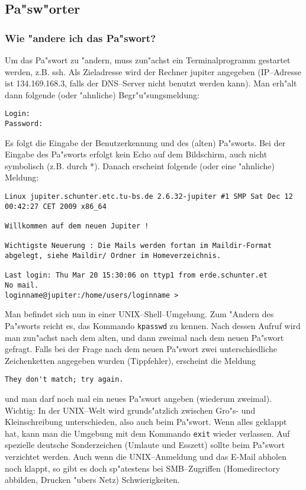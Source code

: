 
\subsection{Pa"sw"orter}
\label{passwort}

\subsubsection*{Wie "andere ich das Pa"swort?}

Um das Pa"swort zu "andern, muss zun"achst ein Terminalprogramm gestartet werden,
z.B. \glossar ssh. Als Zieladresse wird der Rechner jupiter angegeben
(IP--Adresse ist 134.169.168.3, falls der \glossar DNS--Server nicht benutzt
werden kann). Man erh"alt dann folgende (oder "ahnliche) Begr"u"sungsmeldung: 

\begin{verbatim}
Login:
Password: 
\end{verbatim}
Es folgt die Eingabe der Benutzerkennung und des (alten) Pa"sworts. Bei der
Eingabe des Pa"sworts erfolgt kein Echo auf dem Bildschirm, auch nicht
symbolisch (z.B. durch *). Danach erscheint folgende (oder eine "ahnliche)
Meldung:
\begin{verbatim}
Linux jupiter.schunter.etc.tu-bs.de 2.6.32-jupiter #1 SMP Sat Dec 12 00:42:27 CET 2009 x86_64

Willkommen auf dem neuen Jupiter !

Wichtigste Neuerung : Die Mails werden fortan im Maildir-Format
abgelegt, siehe Maildir/ Ordner im Homeverzeichnis.

Last login: Thu Mar 20 15:30:06 on ttyp1 from erde.schunter.et
No mail.
loginname@jupiter:/home/users/loginname >
\end{verbatim}

Man befindet sich nun in einer \glossar UNIX--Shell--Umgebung. Zum "Andern des
Pa"sworts reicht es, das Kommando \verb#kpasswd# zu kennen. Nach dessen Aufruf
wird man zun"achst nach dem alten, und dann zweimal nach dem neuen Pa"swort
gefragt. Falls bei der Frage nach dem neuen Pa"swort zwei unterschiedliche
Zeichenketten angegeben wurden (Tippfehler), erscheint die Meldung

\verb#They don't match; try again.#

und man darf noch mal ein neues Pa"swort angeben (wiederum zweimal). Wichtig:
In der \glossar UNIX--Welt wird grunds"atzlich zwischen Gro"s- und
Kleinschreibung unterschieden, also auch beim Pa"swort. Wenn alles geklappt
hat, kann man die Umgebung mit dem Kommando \verb#exit# wieder verlassen. Auf
spezielle deutsche Sonderzeichen (Umlaute und Esszett) sollte beim Pa"swort
verzichtet werden. Auch wenn die \glossar UNIX--Anmeldung und das \glossar
E-Mail abholen noch klappt, so gibt es doch sp"atestens bei \glossar
SMB--Zugriffen (\glossar Homedirectory abbilden, Drucken "ubers Netz)
Schwierigkeiten.

